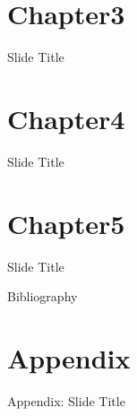 \documentclass[t, 9pt]{beamer}
\begin{document}






\section{Chapter3}

\begin{frame}{Slide Title}

\end{frame}

\section{Chapter4}

\begin{frame}{Slide Title}

\end{frame}


\section{Chapter5}

\begin{frame}{Slide Title}

\end{frame}



\begin{frame}[c]{Bibliography}
    \tiny 
\end{frame}

\section{Appendix}

\begin{frame}{Appendix: Slide Title}

\end{frame}
\end{document}
